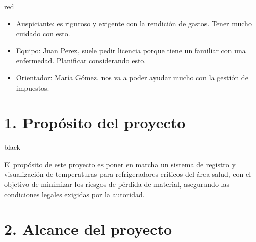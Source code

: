 \documentclass[11pt]{charter}
\begin{document}
\begin{consigna}{red}
 
\begin{itemize}
\item Auspiciante: es riguroso y exigente con la rendición de gastos. Tener mucho cuidado con esto.
\item Equipo: Juan Perez, suele pedir licencia porque tiene un familiar con una enfermedad. Planificar considerando esto.
\item Orientador: María Gómez, nos va a poder ayudar mucho con la gestión de impuestos.
\end{itemize}

\end{consigna}



\section{1. Propósito del proyecto}
\label{sec:proposito}

\begin{consigna}{black}

El propósito de este proyecto es poner en marcha un sistema de registro y visualización de temperaturas para refrigeradores críticos del área salud, con el objetivo de minimizar los riesgos de pérdida de material, asegurando las condiciones legales exigidas por la autoridad.
\end{consigna}

\section{2. Alcance del proyecto}
\label{sec:alcance}
\end{document}
